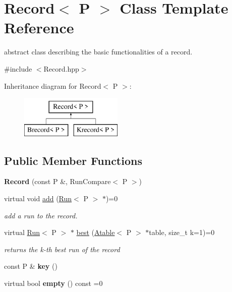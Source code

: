 \hypertarget{classRecord}{}\section{Record$<$ P $>$ Class Template Reference}
\label{classRecord}


abstract class describing the basic functionalities of a record.  




{\ttfamily \#include $<$Record.\+hpp$>$}

Inheritance diagram for Record$<$ P $>$\+:\begin{figure}[H]
\begin{center}
\leavevmode
\includegraphics[height=2.000000cm]{classRecord}
\end{center}
\end{figure}
\subsection*{Public Member Functions}
\begin{DoxyCompactItemize}
\item 
\mbox{\label{classRecord_abfb78c84cf6c1a7b932bec064670c35c}} 
{\bfseries Record} (const P \&, Run\+Compare$<$ P $>$)
\item 
\mbox{\label{classRecord_a33cf3cee78f8b663595f0702f145c9d5}} 
virtual void \mbox{\hyperlink{classRecord_a33cf3cee78f8b663595f0702f145c9d5}{add}} (\mbox{\hyperlink{classRun}{Run}}$<$ P $>$ $\ast$)=0
\begin{DoxyCompactList}\small\item\em add a run to the record. \end{DoxyCompactList}\item 
virtual \mbox{\hyperlink{classRun}{Run}}$<$ P $>$ $\ast$ \mbox{\hyperlink{classRecord_a767aeb8c69e0866328fc82e066af7c3b}{best}} (\mbox{\hyperlink{classAtable}{Atable}}$<$ P $>$ $\ast$table, size\+\_\+t k=1)=0
\begin{DoxyCompactList}\small\item\em returns the k-\/th best run of the record \end{DoxyCompactList}\item 
\mbox{\label{classRecord_a2432ec9a436061e486512d4201322b10}} 
const P \& {\bfseries key} ()
\item 
\mbox{\label{classRecord_aa3b6e99a13b1b6537d2b6bde3abb2978}} 
virtual bool {\bfseries empty} () const =0
\end{DoxyCompactItemize}
